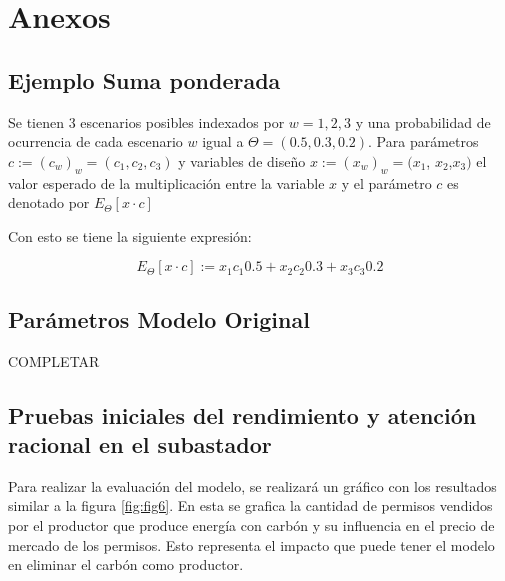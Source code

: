 
\chapter{Anexos}
\label{}



\section{Ejemplo Suma ponderada}\label{ej:sumapond}

Se tienen 3 escenarios posibles indexados por $w = 1,2,3$ y una probabilidad de ocurrencia de cada escenario $w$ igual a $\Theta =(0.5 , 0.3 ,0.2 )$. Para parámetros $c:=(c_{w})_w=(c_1,c_2,c_3)$ y variables de diseño $x:=(x_{w})_w=(x_{1}$, $x_{2}$,$x_{3})$ el valor esperado de la multiplicación entre la variable $x$ y el parámetro $c$ es denotado por $E_{\Theta}[x\cdot c]$
\vspace{2.5mm}

Con esto se tiene la siguiente expresión:

$$E_{\Theta} [ x\cdot c] := x_{1}c_{1}0.5 + x_{2}c_{2}0.3 + x_{3}c_{3}0.2 $$

\section{Parámetros Modelo Original}\label{anexo:parametros}

COMPLETAR

\section{Pruebas iniciales del rendimiento y atención racional en el subastador}\label{anexo:rendimiento}


Para realizar la evaluación del modelo, se realizará un gráfico con los resultados similar a la figura \ref{fig:fig6}. En esta se grafica la cantidad de permisos vendidos por el productor que produce energía con carbón y su influencia en el precio de mercado de los permisos. Esto representa el impacto que puede tener el modelo en eliminar el carbón como productor.

